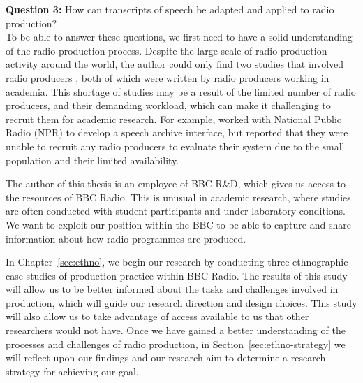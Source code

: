 \noindent
\hangindent=15pt
\textbf{Question 3:} How can transcripts of speech be adapted and applied to radio production?
\\






To be able to answer these questions, we first need to have a solid understanding of the radio production process.
Despite the large scale of radio production activity around the world, the author could only find two studies that
involved radio producers \citep{Dunaway2000,Barbour2004}, both of which were written by radio producers working in
academia.  This shortage of studies may be a result of the limited number of radio producers, and their demanding
workload, which can make it challenging to recruit them for academic research. For example, \citet{Kim2003} worked with
National Public Radio (NPR) to develop a speech archive interface, but reported that they were unable to recruit any
radio producers to evaluate their system due to the small population and their limited availability.


The author of this thesis is an employee of BBC R\&D, which gives us access to the resources of BBC Radio. This is
unusual in academic research, where studies are often conducted with student participants and under laboratory
conditions. We want to exploit our position within the BBC to be able to capture and share information about how radio
programmes are produced.

In Chapter~\ref{sec:ethno}, we begin our research by conducting three ethnographic case studies of production practice
within BBC Radio.  The results of this study will allow us to be better informed about the tasks and challenges
involved in production, which will guide our research direction and design choices.  This study will also allow us to
take advantage of access available to us that other researchers would not have. Once we have gained a better
understanding of the processes and challenges of radio production, in Section~\ref{sec:ethno-strategy} we will reflect
upon our findings and our research aim to determine a research strategy for achieving our goal.



















